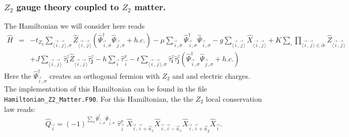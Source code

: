 \subsubsection{$Z_2$ gauge theory coupled to $Z_2$ matter.   }
\label{Z2.Sec}
The Hamiltonian we will consider here reads
\begin{eqnarray}
	\hat{H} & = & -  t_{Z_2} \sum_{\langle \vec{i}, \vec{j} \rangle, \sigma } \hat{Z}_{\langle \vec{i}, \vec{j} \rangle}
	\left(\hat{\Psi}^{\dagger}_{\vec{i},\sigma} \hat{\Psi}^{\phantom{\dagger}}_{\vec{j},\sigma}   + h.c. \right) - \mu \sum_{\vec{i},\sigma} \hat{\Psi}^{\dagger}_{\vec{i},\sigma} \hat{\Psi}^{\phantom{\dagger}}_{\vec{i},\sigma}  
	-g \sum_{\langle \vec{i}, \vec{j} \rangle } \hat{X}_{\langle \vec{i}, \vec{j} \rangle }  +
	  K \sum_{\square} \prod_{\langle \vec{i}, \vec{j} \rangle \in \partial \square} \hat{Z}_{\langle \vec{i}, \vec{j} \rangle}  \nonumber \\
	& &  + J  \sum_{\langle \vec{i}, \vec{j} \rangle}  \hat{\tau}^z_{\pmb{i}}  \hat{Z}_{\langle \vec{i}, \vec{j} \rangle} \hat{\tau}^z_{\pmb{j}}   
	      -  h \sum_{ \vec{i} } \hat{\tau}^x_{\vec{i}}   - t  \sum_{\langle \vec{i}, \vec{j} \rangle, \sigma }   \hat{\tau}^z_{\pmb{i}}   \hat{\tau}^z_{\pmb{j}}  \left( \hat{\Psi}^{\dagger}_{\vec{i},\sigma} \hat{\Psi}^{\phantom{\dagger}}_{\vec{j},\sigma} 	+ h.c. \right)
\end{eqnarray}  
Here the  $\hat{\Psi}^{\dagger}_{\vec{i},\sigma}$  creates an orthogonal fermion with $Z_2$ and  and electric charges.    
The implementation of this Hamiltonian can be found in the file \texttt{Hamiltonian\_Z2\_Matter.F90}.
 For this Hamiltonian, the the $Z_2$ local conservation law reads: 
\begin{equation}
	\hat{Q}_{\vec{i}} =  (-1)^{\sum_{\sigma} \hat{\Psi}^{\dagger}_{\vec{i},\sigma} \hat{\Psi}^{\phantom{\dagger}}_{\vec{j},\sigma}   } 
	\;  \hat{\tau}^{x}_{\vec{i}}  \; \hat{X}_{\vec{i},\vec{i} +  \vec{a}_x} \hat{X}_{\vec{i},\vec{i} -  \vec{a}_x} \hat{X}_{\vec{i},\vec{i} +  \vec{a}_y} \hat{X}_{\vec{i}}.
\end{equation} 

